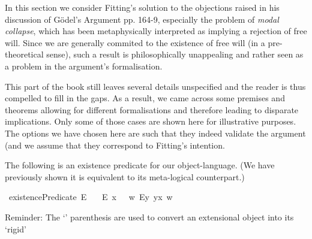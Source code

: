 %
\begin{isabellebody}%
%
%
\isadelimtheory
%
\endisadelimtheory
%
\isatagtheory
%
\endisatagtheory
{\isafoldtheory}%
%
\isadelimtheory
%
\endisadelimtheory
%
\isamarkuptrue%
%
\begin{isamarkuptext}%
In this section we consider Fitting's solution to the objections raised in his discussion of G\"odel's Argument pp. 164-9, 
especially the problem of \emph{modal collapse}, which has been metaphysically interpreted as implying a rejection of free will.
Since we are generally commited to the existence of free will (in a pre-theoretical sense), such a result is
philosophically unappealing and rather seen as a problem in the argument's formalisation.%
\end{isamarkuptext}\isamarkuptrue%
%
\begin{isamarkuptext}%
This part of the book still leaves several details unspecified and the reader is thus compelled to fill in the gaps.
As a result, we came across some premises and theorems allowing for different formalisations and therefore leading to disparate implications.
Only some of those cases are shown here for illustrative purposes. The options we have chosen here are such that
they indeed validate the argument (and we assume that they correspond to Fitting's intention.%
\end{isamarkuptext}\isamarkuptrue%
%
\isamarkuptrue%
%
\begin{isamarkuptext}%
The following is an existence predicate for our object-language. (We have previously shown it is equivalent to its
 meta-logical counterpart.)%
\end{isamarkuptext}\isamarkuptrue%
\isamarkupfalse%
\ existencePredicate{\isacharcolon}{\isacharcolon}{\isachardoublequoteopen}{\isasymup}{\isasymlangle}{\isasymzero}{\isasymrangle}{\isachardoublequoteclose}\ {\isacharparenleft}{\isachardoublequoteopen}E{\isacharbang}{\isachardoublequoteclose}{\isacharparenright}\ \isanewline
\ \ {\isachardoublequoteopen}E{\isacharbang}\ x\ \ {\isasymequiv}\ {\isacharparenleft}{\isasymlambda}w{\isachardot}\ {\isacharparenleft}\isactrlbold {\isasymexists}\isactrlsup Ey{\isachardot}\ y\isactrlbold {\isasymapprox}x{\isacharparenright}\ w{\isacharparenright}{\isachardoublequoteclose}%
\begin{isamarkuptext}%
Reminder: The `\isa{{\isasymlparr}{\isacharunderscore}{\isasymrparr}}' parenthesis are used to convert an extensional object into its `rigid'

\end{isamarkuptext}
\end{isabellebody}
